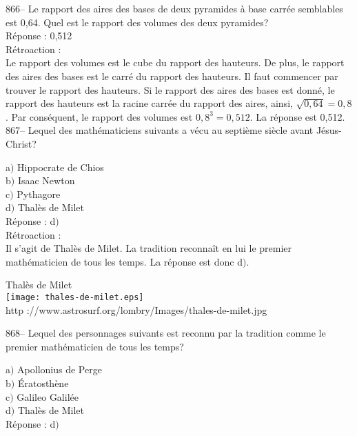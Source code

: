 ﻿\documentclass[letterpaper, 12pt]{article}
\begin{document}
866-- Le rapport des aires des bases de deux pyramides \`a base carr\'ee
semblables est 0,64.  Quel est le rapport des volumes des deux pyramides?\\

R\'eponse : 0,512\\

R\'etroaction : \\
Le rapport des volumes est le cube du rapport des hauteurs.  De
plus, le rapport des aires des bases est le carr\'e du rapport des
hauteurs.  Il faut commencer par trouver le rapport des hauteurs.
Si le rapport des aires des bases est donn\'e, le rapport des
hauteurs est la racine carr\'ee du rapport des aires, ainsi,
$\sqrt{0,64}=0,8$.
Par cons\'equent, le rapport des volumes est $0,8^{3}=0,512$. La r\'eponse
est 0,512.\\


867-- Lequel des math\'ematiciens suivants a v\'ecu au septi\`eme
si\`ecle avant J\'esus-Christ?

a$)$ Hippocrate de Chios \\
b$)$ Isaac Newton \\
c$)$ Pythagore \\
d$)$ Thal\`es de Milet\\

R\'eponse : d$)$\\

R\'etroaction :\\
Il s'agit de Thal\`es de Milet. La tradition reconna\^it en lui le
premier math\'ematicien de tous les temps. La r\'eponse est donc
d$)$.

    \begin{center}
        Thal\`es de Milet\\
    \texttt{[image: thales-de-milet.eps]}\\
        {\footnotesize http
://www.astrosurf.org/lombry/Images/thales-de-milet.jpg}
    \end{center}

868-- Lequel des personnages suivants est reconnu par la tradition
comme le premier math\'ematicien de tous les temps?

a$)$ Apollonius de Perge \\
b$)$ \'Eratosth\`ene \\
c$)$ Galileo Galil\'ee \\
d$)$ Thal\`es de Milet \\

R\'eponse : d$)$\\
\end{document}
